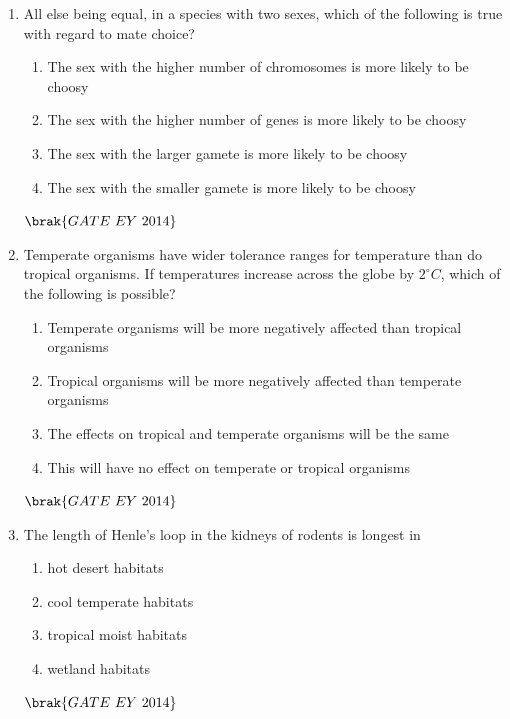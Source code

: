 \documentclass[journal]{IEEEtran}
\numberwithin{equation}{enumi}
\numberwithin{figure}{enumi}
\begin{document}
\begin{enumerate}
    \item All else being equal, in a species with two sexes, which of the following is true with regard to mate choice?
    \begin{enumerate}
        \item The sex with the higher number of chromosomes is more likely to be choosy
        \item The sex with the higher number of genes is more likely to be choosy
        \item The sex with the larger gamete is more likely to be choosy
        \item The sex with the smaller gamete is more likely to be choosy
    \end{enumerate}
    \hfill{$\brak{ GATE\ EY\ 2014}$}
    \bigskip
    
    \item Temperate organisms have wider tolerance ranges for temperature than do tropical organisms. If temperatures increase across the globe by $2^{\circ}C$, which of the following is possible?
    \begin{enumerate}
        \item Temperate organisms will be more negatively affected than tropical organisms
        \item Tropical organisms will be more negatively affected than temperate organisms
        \item The effects on tropical and temperate organisms will be the same
        \item This will have no effect on temperate or tropical organisms
    \end{enumerate}
    \hfill{$\brak{ GATE\ EY\ 2014}$}
    \bigskip
    
    \item The length of Henle's loop in the kidneys of rodents is longest in
    \begin{multicols}{2}
    \begin{enumerate}
        \item hot desert habitats
        \item cool temperate habitats
        \item tropical moist habitats
        \item wetland habitats
    \end{enumerate}
    \end{multicols}
    \hfill{$\brak{ GATE\ EY\ 2014}$}
    \bigskip
    

\end{enumerate}
\end{document}
